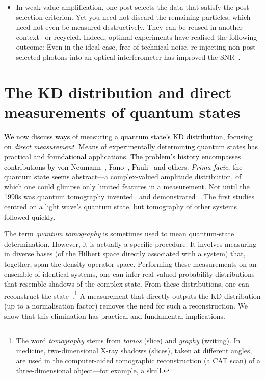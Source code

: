 \documentclass[%
 reprint,
superscriptaddress,
nofootinbib,
bibnotes,
 amsmath,amssymb,
 aps,
]{revtex4-1}
\theoremstyle{plain}
\newcommand{\Dave}[1]{\textcolor{black}{#1} }
\newcommand{\nicole}[1]{\textcolor{black}{#1} }
\begin{document}
\begin{itemize}
    \item 
    In weak-value amplification, one post-selects the data that satisfy the post-selection criterion. Yet you need not discard the remaining particles, which need not even be measured destructively.  They can be reused in another context~\cite{Starling10} or recycled.  Indeed, optimal experiments have realised the following outcome: Even in the ideal case, free of technical noise, re-injecting non-post-selected photons into an optical interferometer has improved the SNR~\cite{Dressel13,Lyons15,Krafczyk21,Wang16}.
   \end{itemize}

   


\section{The KD distribution and direct measurements of quantum states}

\label{Sec:StateMeas}


\nicole{
We now discuss ways of measuring a quantum state's KD distribution, focusing on \emph{direct measurement}. Means of experimentally determining quantum states has practical and foundational applications. The problem's history encompasses contributions by von Neumann~\cite{Birkhoff1936}, Fano~\cite{Fano1957}, Pauli~\cite{Pauli1980} and others.}
\nicole{\emph{Prima facie}, the quantum state seems} abstract---a complex-valued amplitude distribution, of which one could glimpse only limited features in a measurement. Not until the 1990s was quantum tomography invented~\cite{Vogel1989} and demonstrated~\cite{Smithey1993}. 
The first studies centred on a light wave's quantum state, but tomography of other systems followed quickly. 

The term \emph{quantum tomography} is sometimes used to mean quantum-state determination. However, it is actually a specific procedure. It involves measuring in diverse bases (of the Hilbert space directly associated with a system) 
that, together, span the density-operator space. Performing these measurements on an  ensemble of identical systems, 
one can infer real-valued probability distributions that 
resemble shadows of the complex state. From these distributions, one can reconstruct the state~\cite{jordan2016mapping}.\footnote{The word \emph{tomography} stems from \emph{tomos} (slice) and \emph{graphy} (writing). In medicine, two-dimensional X-ray shadows (slices), taken at different angles, are used in the computer-aided tomographic reconstruction (a CAT scan) of a three-dimensional object---for example, a skull.} A measurement that directly outputs the KD distribution (up to a normalisation factor) removes the need for such a reconstruction. We show that this elimination \Dave{has practical and fundamental implications.}
\end{document}
